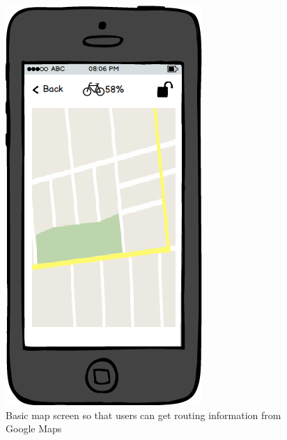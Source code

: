 \documentclass[a4paper]{report}
\begin{document}
\clearpage
\begin{figure}
\centering
\includegraphics[scale=0.9]{figures/prototype_2/map}
\caption{Basic map screen so that users can get routing information from Google Maps}
\end{figure}
\clearpage

  


 
\end{document}
